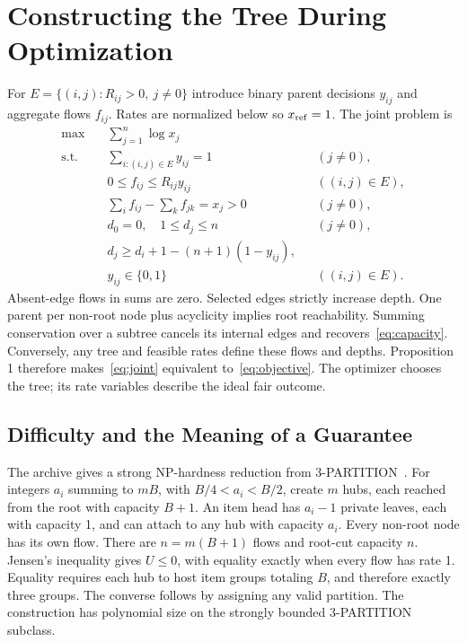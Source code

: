 \documentclass[conference,letterpaper]{IEEEtran}
\begin{document}
\section{Constructing the Tree During Optimization}
For $E=\{(i,j):R_{ij}>0,\ j\ne0\}$ introduce binary parent decisions $y_{ij}$ and aggregate flows $f_{ij}$. Rates are normalized below so $x_{\rm ref}=1$. The joint problem is
\begin{align}
\max\quad &\sum_{j=1}^n\log x_j\label{eq:joint}\\
\text{s.t.}\quad&\sum_{i:(i,j)\in E}y_{ij}=1 &&(j\ne0),\nonumber\\
&0\le f_{ij}\le R_{ij}y_{ij} &&((i,j)\in E),\nonumber\\
&\sum_i f_{ij}-\sum_k f_{jk}=x_j>0 &&(j\ne0),\nonumber\\
&d_0=0,\quad1\le d_j\le n &&(j\ne0),\nonumber\\
&d_j\ge d_i+1-(n+1)(1-y_{ij}),\nonumber\\
&y_{ij}\in\{0,1\} &&((i,j)\in E).\nonumber
\end{align}
Absent-edge flows in sums are zero. Selected edges strictly increase depth. One parent per non-root node plus acyclicity implies root reachability. Summing conservation over a subtree cancels its internal edges and recovers~\eqref{eq:capacity}. Conversely, any tree and feasible rates define these flows and depths. Proposition 1 therefore makes~\eqref{eq:joint} equivalent to~\eqref{eq:objective}. The optimizer chooses the tree; its rate variables describe the ideal fair outcome.

\subsection{Difficulty and the Meaning of a Guarantee}
The archive gives a strong NP-hardness reduction from 3-PARTITION~\cite{garey}. For integers $a_i$ summing to $mB$, with $B/4<a_i<B/2$, create $m$ hubs, each reached from the root with capacity $B+1$. An item head has $a_i-1$ private leaves, each with capacity 1, and can attach to any hub with capacity $a_i$. Every non-root node has its own flow. There are $n=m(B+1)$ flows and root-cut capacity $n$. Jensen's inequality gives $U\le0$, with equality exactly when every flow has rate 1. Equality requires each hub to host item groups totaling $B$, and therefore exactly three groups. The converse follows by assigning any valid partition. The construction has polynomial size on the strongly bounded 3-PARTITION subclass.
\end{document}
